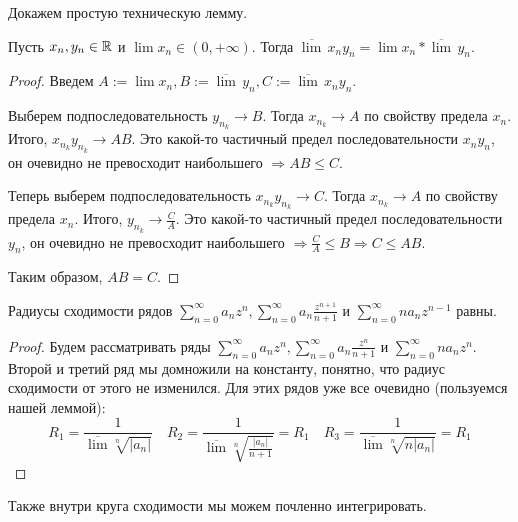 \vspace*{10mm}

Докажем простую техническую лемму.

\begin{lemma}
    Пусть $x_n, y_n \in \mathbb{R}$ и $\lim x_n \in (0, +\infty)$. 
    Тогда $\overline{\lim} \, x_ny_n = \lim x_n * \overline{\lim} \, y_n$.
\end{lemma}
\begin{proof}
    Введем $A := \lim x_n, B := \overline{\lim} \, y_n, C := \overline{\lim} \, x_ny_n$.

    \quad Выберем подпоследовательность $y_{n_k} \to B$. 
    Тогда $x_{n_k} \to A$ по свойству предела $x_n$.
    Итого, $x_{n_k}y_{n_k} \to AB$. 
    Это какой-то частичный предел последовательности $x_ny_n$, он очевидно не превосходит наибольшего $\Rightarrow AB \leqslant C$.

    \quad Теперь выберем подпоследовательность $x_{n_k}y_{n_k} \to C$. 
    Тогда $x_{n_k} \to A$ по свойству предела $x_n$.
    Итого, $y_{n_k} \to \frac{C}{A}$.
    Это какой-то частичный предел последовательности $y_n$, он очевидно не превосходит наибольшего $\Rightarrow \frac{C}{A} \leqslant B \Rightarrow C \leqslant AB$.

    \quad Таким образом, $AB = C$.
\end{proof}

\begin{follow}
    Радиусы сходимости рядов $\sum\limits_{n=0}^\infty a_n z^n, \sum\limits_{n=0}^\infty a_n \frac{z^{n+1}}{n+1}$ и $\sum\limits_{n=0}^\infty n a_n z^{n-1}$ равны.
\end{follow}
\begin{proof}
    Будем рассматривать ряды $\sum\limits_{n=0}^\infty a_n z^n, \sum\limits_{n=0}^\infty a_n \frac{z^n}{n+1}$ и $\sum\limits_{n=0}^\infty n a_n z^{n}$. 
    Второй и третий ряд мы домножили на константу, понятно, что радиус сходимости от этого не изменился.
    Для этих рядов уже все очевидно (пользуемся нашей леммой): \[ R_1 = \frac{1}{\overline{\lim} \sqrt[n]{|a_n|}} \quad R_2 = \frac{1}{\overline{\lim} \sqrt[n]{\frac{|a_n|}{n+1}}} = R_1 \quad R_3 = \frac{1}{\overline{\lim} \sqrt[n]{n|a_n|}} = R_1   \]
\end{proof}

\vspace*{5mm}

Также внутри круга сходимости мы можем почленно интегрировать.

